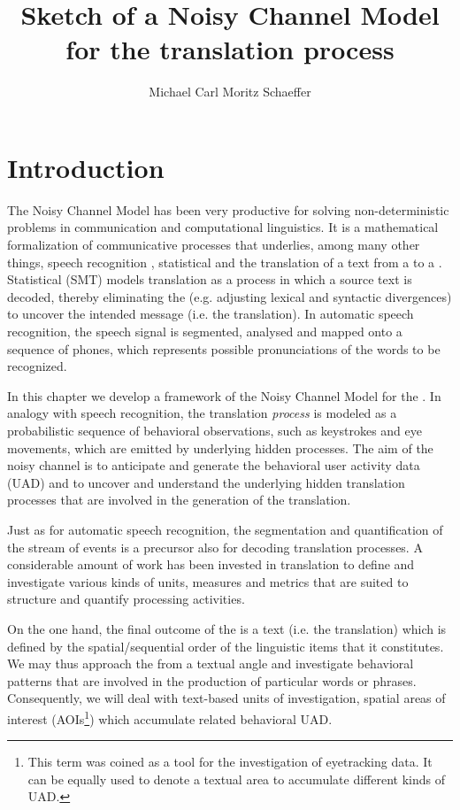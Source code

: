 \documentclass[output=paper]{LSP/langsci}
\author{Michael Carl\affiliation{Renmin University of China}\lastand
Moritz Schaeffer\affiliation{Johannes Gutenberg University of Mainz}}
\title{Sketch of a Noisy Channel Model for the translation process}
\begin{document}
         
\maketitle   

\section{Introduction}
\label{carl-schaeffer:sec:1}
The Noisy Channel Model \citep{Shannon1949} has been very productive for solving non-deterministic problems in communication and computational linguistics. It is a mathematical formalization of communicative processes that underlies, among many other things, speech recognition \citep{Xuedong1990}, statistical  \citep{Brown1993} and the translation of a text from a  to a . Statistical  (SMT) models translation as a process in which a source text is decoded, thereby eliminating the  (e.g. adjusting lexical and syntactic divergences) to uncover the intended message (i.e. the translation). In automatic speech recognition, the speech signal is segmented, analysed and mapped onto a sequence of phones, which represents possible pronunciations of the words to be recognized.

In this chapter we develop a framework of the Noisy Channel Model for the . In analogy with speech recognition, the translation \textit{process} is modeled as a probabilistic sequence of behavioral observations, such as keystrokes and eye movements, which are emitted by underlying hidden processes. The aim of the noisy channel is to anticipate and generate the behavioral user activity  data (UAD) and to
uncover and understand the underlying hidden translation processes that are involved in the generation of the translation. 

Just as for automatic speech recognition, the segmentation and quantification of the stream of events is a precursor also for decoding translation processes. A considerable amount of work has been invested in translation  to define and investigate various kinds of units, measures and metrics that are suited to structure and quantify processing activities. 

On the one hand, the final outcome of the  is a text (i.e. the translation) which is defined by the spatial/sequential order of the linguistic items that it constitutes. We may thus approach the  from a textual angle and investigate behavioral patterns that are involved in the production of particular words or phrases. Consequently, we will deal with text-based units of investigation, spatial areas of interest (AOIs\footnote{This term was coined as a tool for the investigation of eyetracking data. It can be equally used to denote a textual area to accumulate different kinds of UAD.}) which accumulate related behavioral UAD. 
\end{document}
